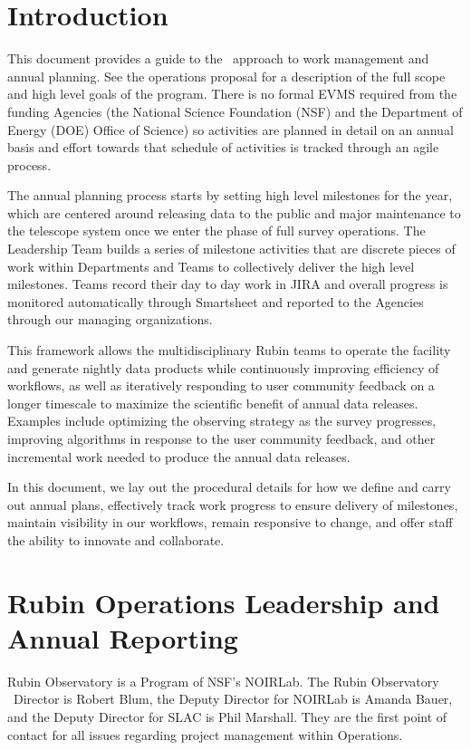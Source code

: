 \section{Introduction}

This document provides a guide to the \VRO\ approach to work management and annual planning.
See the operations proposal  for a description of the full scope and high level goals of the program.
There is no formal \gls{EVMS} required from the funding Agencies (the National Science Foundation (NSF) and the Department of Energy (DOE) Office of Science) so activities are planned in detail on an annual basis and effort towards that schedule of activities is tracked through an agile process.

The annual planning process starts by setting high level milestones for the year, which are centered around releasing data to the public and major maintenance to the telescope system once we enter the phase of full survey operations.   
The Leadership Team builds a series of milestone activities that are discrete pieces of work within Departments and Teams to collectively deliver the high level milestones.  
Teams record their day to day work in \gls{JIRA} and overall progress is monitored automatically through Smartsheet and reported to the Agencies through our managing organizations.

This framework allows the multidisciplinary Rubin teams to operate the facility and generate nightly data products while continuously improving efficiency of workflows,
as well as iteratively responding to user community feedback on a longer timescale to maximize the scientific benefit of annual data releases.
Examples include optimizing the observing strategy as the survey progresses, improving algorithms in response to the user community feedback, 
and other incremental work needed to produce the annual data releases.

In this document, we lay out the procedural details for how we define and carry out annual plans, effectively track work progress to ensure delivery of milestones, maintain visibility in our workflows, remain responsive to change, and offer staff the ability to innovate and collaborate.

\section{Rubin Operations Leadership and Annual Reporting}
\label{sec:contacts}

Rubin Observatory is a Program of NSF's NOIRLab.
The Rubin Observatory \ \gls{Director} is Robert Blum, the Deputy \gls{Director} for NOIRLab is Amanda Bauer, and the Deputy \gls{Director} for SLAC is Phil Marshall.
They are the first point of contact for all issues regarding project management within \RO Operations.

